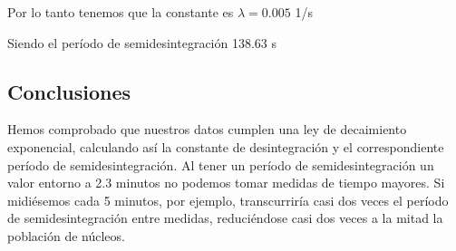 \documentclass[11pt]{article}
\begin{document}
            
    
    Por lo tanto tenemos que la constante es \(\lambda = 0.005\) 1/s

    
 
            
    
    Siendo el período de semidesintegración 138.63 s

    

    \hypertarget{conclusiones}{%
\subsection{Conclusiones}\label{conclusiones}}

Hemos comprobado que nuestros datos cumplen una ley de decaimiento
exponencial, calculando así la constante de desintegración y el
correspondiente período de semidesintegración. Al tener un período de
semidesintegración un valor entorno a 2.3 minutos no podemos tomar
medidas de tiempo mayores. Si midiésemos cada 5 minutos, por ejemplo,
transcurriría casi dos veces el período de semidesintegración entre
medidas, reduciéndose casi dos veces a la mitad la población de núcleos.


    
    
    
\end{document}
